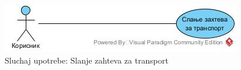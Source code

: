 \begin{figure}[h!]
    \includegraphics[scale=0.7]{Dijagrami/DSUzahtev.jpg}
    \centering
    \caption{Sluchaj upotrebe: Slanje zahteva za transport}
    \label{dsuzahtev}
\end{figure}    